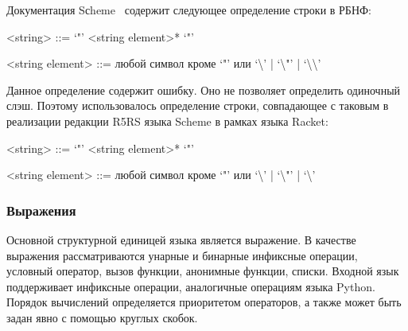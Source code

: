 \documentclass[12pt,a4paper,oneside]{extarticle}
\begin{document}
            Документация Sсheme~\cite{r5rs} содержит следующее определение строки в РБНФ:
            \begin{grammar}
                <string> ::= `"' <string element>* `"'

                <string element> ::= любой символ кроме `"' или `\textbackslash' | `\textbackslash "' | `\textbackslash \textbackslash'
            \end{grammar}
            Данное определение содержит ошибку.
            Оно не позволяет определить одиночный слэш.
            Поэтому использовалось определение строки, совпадающее с таковым в реализации редакции R5RS языка Scheme в рамках языка Racket: 
            \begin{grammar}
                <string> ::= `"' <string element>* `"'

                <string element> ::= любой символ кроме `"' или `\textbackslash' | `\textbackslash "' | `\textbackslash'
            \end{grammar}

        \subsubsection{Выражения}
            Основной структурной единицей языка является выражение.
            В качестве выражения рассматриваются унарные и бинарные инфиксные операции, условный оператор, вызов функции, анонимные функции, списки.
            Входной язык поддерживает инфиксные операции, аналогичные операциям языка Python.
            Порядок вычислений определяется приоритетом операторов, а также может быть задан явно с помощью круглых скобок.
\end{document}

